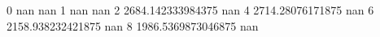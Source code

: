 0 nan nan
1 nan nan
2 2684.142333984375 nan
4 2714.28076171875 nan
6 2158.938232421875 nan
8 1986.5369873046875 nan
